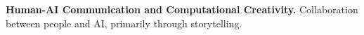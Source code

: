 {\color{black}\fontsize{12pt}{1em}} 







{\color{teal} {\bf Human-AI Communication and Computational Creativity.}} {\bodyfontlight Collaboration between people and AI, primarily through storytelling.}

